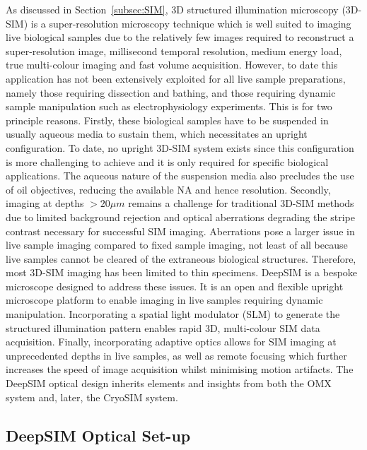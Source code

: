 As discussed in Section~\ref{subsec:SIM}, 3D structured illumination microscopy (3D-SIM) is a super-resolution 
microscopy technique which is well suited to imaging live biological samples 
due to the relatively few images required to reconstruct a super-resolution 
image, millisecond temporal resolution, medium energy load, true multi-colour 
imaging and fast volume 
acquisition\cite{schermelleh2010guide,schermelleh2019super,schermelleh2008subdiffraction}.
However, to date this application has not been extensively exploited for all 
live sample preparations, namely those requiring dissection and bathing, and 
those requiring dynamic sample manipulation such as electrophysiology 
experiments. This is for two principle reasons. Firstly, these biological 
samples have to be suspended in usually aqueous  media to sustain them, which 
necessitates an upright configuration. To date, no upright 3D-SIM system 
exists since this configuration is more challenging to achieve and it is 
only required for specific biological applications. The aqueous nature of 
the suspension media also precludes the use of 
oil objectives, reducing the available NA and hence resolution. Secondly, 
imaging at depths $>20\mu m$ remains a challenge for traditional 3D-SIM 
methods due to limited background rejection and optical aberrations degrading 
the stripe contrast necessary for successful SIM imaging\cite{wu2018faster}. 
Aberrations pose a larger issue in live sample imaging compared to fixed 
sample imaging, not least of all because live samples cannot be cleared of 
the extraneous biological structures. Therefore, most 3D-SIM imaging has been 
limited to thin specimens\cite{weil2010distinguishing}. DeepSIM is a bespoke 
microscope designed to address these issues. It is an open and flexible 
upright microscope platform to enable imaging in live samples requiring 
dynamic manipulation. Incorporating a spatial light
modulator (SLM) to generate the structured 
illumination pattern enables rapid 3D, multi-colour SIM data acquisition. 
Finally, incorporating adaptive optics allows for SIM imaging at 
unprecedented depths in live samples, as well as remote focusing which 
further increases the speed of image acquisition whilst minimising motion 
artifacts. The DeepSIM optical design inherits elements and insights from 
both the OMX system\cite{haase2008omx,dobbie2011omx} and, later, the 
CryoSIM system\cite{phillips2020cryosim}.

\subsection{DeepSIM Optical Set-up}
\label{subsec:DeepSIM_optics}

